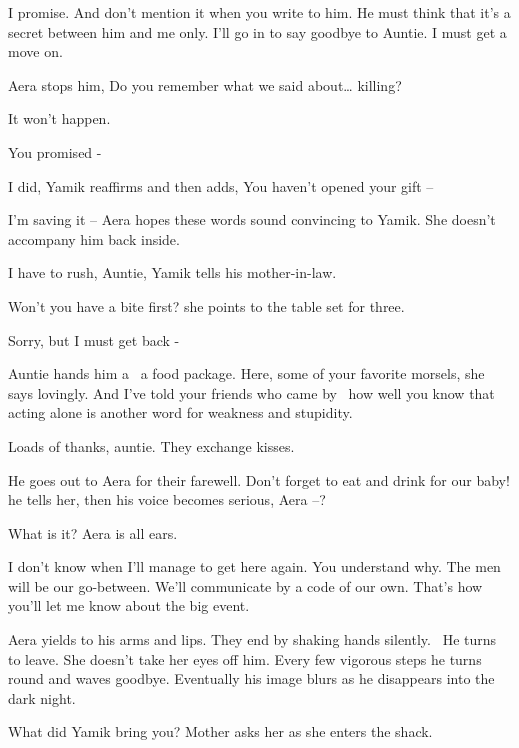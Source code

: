 \documentclass[12pt]{book}
\begin{document}
{\textquotedbl}I promise. And don't mention it when you write to him. He must think that it's a secret between him and
me only. I'll go in to say goodbye to Auntie. I must get a move on.{\textquotedbl}

Aera stops him, {\textquotedbl}Do you remember what we said about{\dots} killing?{\textquotedbl}

{\textquotedbl}It won't happen.{\textquotedbl}

{\textquotedbl}You promised -{\textquotedbl}

{\textquotedbl}I did,{\textquotedbl} Yamik reaffirms and then adds, {\textquotedbl}You haven't opened your gift
--{\textquotedbl}

{\textquotedbl}I'm saving it --{\textquotedbl} Aera hopes these words sound convincing to Yamik. She doesn't accompany
him back inside.

{\textquotedbl}I have to rush, Auntie,{\textquotedbl} Yamik tells his mother-in-law.

{\textquotedbl}Won't you have a bite first?{\textquotedbl} she points to the table set for three.

{\textquotedbl}Sorry, but I must get back -{\textquotedbl}

Auntie hands him a \ a food package. {\textquotedbl}Here, some of your favorite morsels,{\textquotedbl} she says
lovingly. {\textquotedbl}And I've told your friends who came by \ how well you know that acting alone is another word
for weakness and stupidity.{\textquotedbl}

{\textquotedbl}Loads of thanks, auntie.{\textquotedbl} They exchange kisses.

He goes out{ }to Aera for their farewell. {\textquotedbl}Don't forget to eat and drink for our
baby!{\textquotedbl} he tells her, then his voice becomes serious, {\textquotedbl}Aera --?{\textquotedbl}

{\textquotedbl}What is it?{\textquotedbl} Aera is all ears.

{\textquotedbl}I don't know when I'll manage to get here again. You understand why. The men will be our go-between.
We'll communicate by a code of our own. That's how you'll let me know about the big event.{\textquotedbl}

Aera yields to his arms and lips. They end by shaking hands silently. ~He turns to leave. She doesn't take her eyes off
him. Every few vigorous steps he turns round and waves goodbye. Eventually his image blurs as he disappears into the
dark night.

{\textquotedbl}What did Yamik bring you?{\textquotedbl} Mother asks her as she enters the shack.
\end{document}
